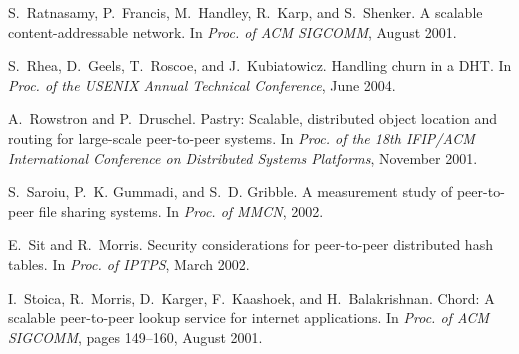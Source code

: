 \documentclass{sig-alt-release}
\begin{document}
\begin{thebibliography}{10}
S.~Ratnasamy, P.~Francis, M.~Handley, R.~Karp, and S.~Shenker.
\newblock A scalable content-addressable network.
\newblock In {\em Proc. of ACM SIGCOMM}, August 2001.

S.~Rhea, D.~Geels, T.~Roscoe, and J.~Kubiatowicz.
\newblock Handling churn in a {DHT}.
\newblock In {\em Proc. of the USENIX Annual Technical Conference}, June 2004.

A.~Rowstron and P.~Druschel.
\newblock Pastry: Scalable, distributed object location and routing for
  large-scale peer-to-peer systems.
\newblock In {\em Proc. of the 18th IFIP/ACM International Conference on
  Distributed Systems Platforms}, November 2001.

S.~Saroiu, P.~K. Gummadi, and S.~D. Gribble.
\newblock A measurement study of peer-to-peer file sharing systems.
\newblock In {\em Proc. of MMCN}, 2002.

E.~Sit and R.~Morris.
\newblock Security considerations for peer-to-peer distributed hash tables.
\newblock In {\em Proc. of IPTPS}, March 2002.

I.~Stoica, R.~Morris, D.~Karger, F.~Kaashoek, and H.~Balakrishnan.
\newblock Chord: A scalable peer-to-peer lookup service for internet
  applications.
\newblock In {\em Proc. of ACM SIGCOMM}, pages 149--160, August 2001.

\end{thebibliography}
\end{document}
